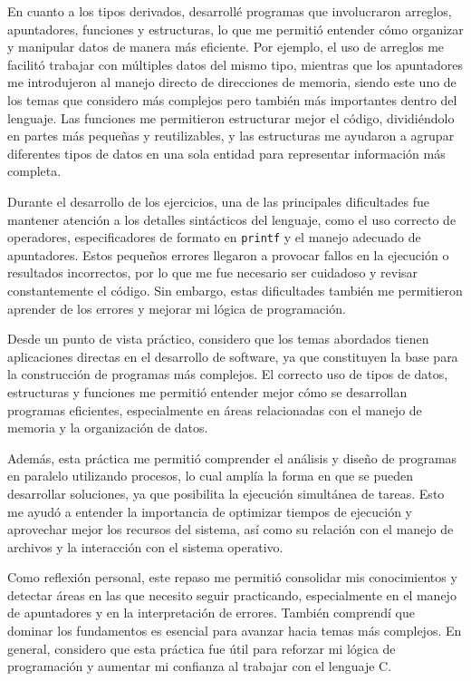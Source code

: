 En cuanto a los tipos derivados, desarrollé programas que involucraron arreglos, apuntadores, funciones y estructuras, lo que me permitió entender cómo organizar y manipular datos de manera más eficiente. Por ejemplo, el uso de arreglos me facilitó trabajar con múltiples datos del mismo tipo, mientras que los apuntadores me introdujeron al manejo directo de direcciones de memoria, siendo este uno de los temas que considero más complejos pero también más importantes dentro del lenguaje. Las funciones me permitieron estructurar mejor el código, dividiéndolo en partes más pequeñas y reutilizables, y las estructuras me ayudaron a agrupar diferentes tipos de datos en una sola entidad para representar información más completa.

Durante el desarrollo de los ejercicios, una de las principales dificultades fue mantener atención a los detalles sintácticos del lenguaje, como el uso correcto de operadores, especificadores de formato en \texttt{printf} y el manejo adecuado de apuntadores. Estos pequeños errores llegaron a provocar fallos en la ejecución o resultados incorrectos, por lo que me fue necesario ser cuidadoso y revisar constantemente el código. Sin embargo, estas dificultades también me permitieron aprender de los errores y mejorar mi lógica de programación.

Desde un punto de vista práctico, considero que los temas abordados tienen aplicaciones directas en el desarrollo de software, ya que constituyen la base para la construcción de programas más complejos. El correcto uso de tipos de datos, estructuras y funciones me permitió entender mejor cómo se desarrollan programas eficientes, especialmente en áreas relacionadas con el manejo de memoria y la organización de datos.

Además, esta práctica me permitió comprender el análisis y diseño de programas en paralelo utilizando procesos, lo cual amplía la forma en que se pueden desarrollar soluciones, ya que posibilita la ejecución simultánea de tareas. Esto me ayudó a entender la importancia de optimizar tiempos de ejecución y aprovechar mejor los recursos del sistema, así como su relación con el manejo de archivos y la interacción con el sistema operativo.

Como reflexión personal, este repaso me permitió consolidar mis conocimientos y detectar áreas en las que necesito seguir practicando, especialmente en el manejo de apuntadores y en la interpretación de errores. También comprendí que dominar los fundamentos es esencial para avanzar hacia temas más complejos. En general, considero que esta práctica fue útil para reforzar mi lógica de programación y aumentar mi confianza al trabajar con el lenguaje C.

